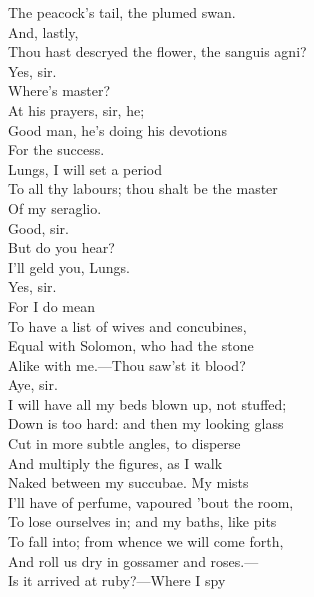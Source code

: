 \documentclass[a4paper,oneside,12pt]{memoir}
\begin{document}
\begin{drama*}
The peacock's tail, the plumed swan.\\
\mammonspeaks {} And, lastly,\\
Thou hast descryed the flower, the sanguis agni?\\
\facespeaks Yes, sir.\\
\mammonspeaks {} Where's master?\\
\facespeaks {} At his prayers, sir, he;\\
Good man, he's doing his devotions\\
For the success.\\
\mammonspeaks {} Lungs, I will set a period\\
To all thy labours; thou shalt be the master\\
Of my seraglio.\\
\facespeaks {} Good, sir.\\
\mammonspeaks {} But do you hear?\\
I'll geld you, Lungs.\\
\facespeaks {} Yes, sir.\\
\mammonspeaks {} For I do mean\\
To have a list of wives and concubines,\\
Equal with Solomon, who had the stone\\
Alike with me.---Thou saw'st it blood?\\
\facespeaks {} Aye, sir.\\
\mammonspeaks I will have all my beds blown up, not stuffed;\\
Down is too hard: and then my looking glass\\
Cut in more subtle angles, to disperse\\
And multiply the figures, as I walk\\
Naked between my succubae. My mists\\
I'll have of perfume, vapoured 'bout the room,\\
To lose ourselves in; and my baths, like pits\\
To fall into; from whence we will come forth,\\
And roll us dry in gossamer and roses.---\\
Is it arrived at ruby?---Where I spy\\

\end{drama*}
\end{document}
